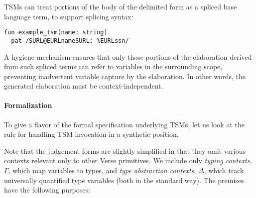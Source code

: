 TSMs can treat portions of the body of the delimited form as a spliced base language term, to support splicing syntax:
\begin{lstlisting}[numbers=none]
fun example_tsm(name: string)
  pat /SURL@EURLnameSURL: %EURLssn/
\end{lstlisting}
A hygiene mechanism ensures that only those portions of the elaboration derived from such spliced terms can refer to variables in the surrounding scope, preventing inadvertent variable capture by the elaboration. In other words, the generated elaboration must be context-independent.

\paragraph{Formalization} To give a flavor of the formal specification underlying TSMs, let us look at the rule for handling TSM invocation in a synthetic position. 
\begin{mathpar}
\end{mathpar}
Note that the judgement forms are  slightly simplified in that they omit various contexts relevant only to other Verse primitives. We include only \emph{typing contexts}, $\Gamma$, which map variables to types, and \emph{type abstraction contexts}, $\Delta$, which track universally quantified type variables (both in the standard way). The premises have the following purposes:
